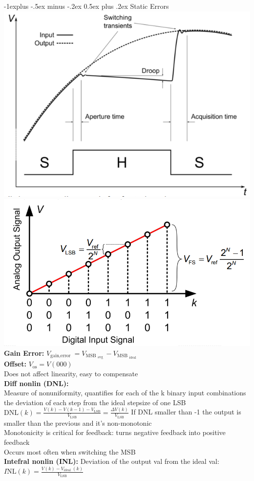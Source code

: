 \documentclass[5pt]{article}
\makeatletter
\renewcommand{\subsection}{\@startsection{subsection}{2}{0mm}%
                                {-1explus -.5ex minus -.2ex}%
                                {0.5ex plus .2ex}%
                                {\normalfont\normalsize\bfseries}}
\makeatother
\begin{document}
\begin{multicols*}{4}
\subsection{Static Errors}
\includegraphics[width=0.8\columnwidth]{images/sample_hold_char.png}\\
\includegraphics[width=0.9\columnwidth]{images/dac_function.png}\\
\textbf{Gain Error:} $ V_{\text {gain,error }}=V_{\text {MSB }_{\text {avg }}}-V_{\text {MSB }_{\text {ideal }}} $\\
\textbf{Offset:} $ V_{\mathrm{os}}=V(000) $\\
Does not affect linearity, easy to compensate\\
\textbf{Diff nonlin (DNL):}\\
Measure of nonuniformity, quantifies for each of the k binary input combinations the deviation of each step from the ideal stepsize of one LSB\\
$ \mathrm{DNL}(k)=\frac{V(k)-V(k-1)-V_{\mathrm{LSB}}}{V_{\mathrm{LSB}}}=\frac{\Delta V(k)}{V_{\mathrm{LSB}}} $
If DNL smaller than -1 the output is smaller than the previous and it's non-monotonic\\
Monotonicity is critical for feedback: turns negative feedback into positive feedback\\
Occurs most often when switching the MSB\\
\textbf{Intefral nonlin (INL):}
Deviation of the output val from the ideal val:\\
$ I \mathrm{NL}(k)=\frac{V(k)-V_{\text {ideal }}(k)}{V_{\mathrm{LSB}}} $

\end{multicols*}
\end{document}
